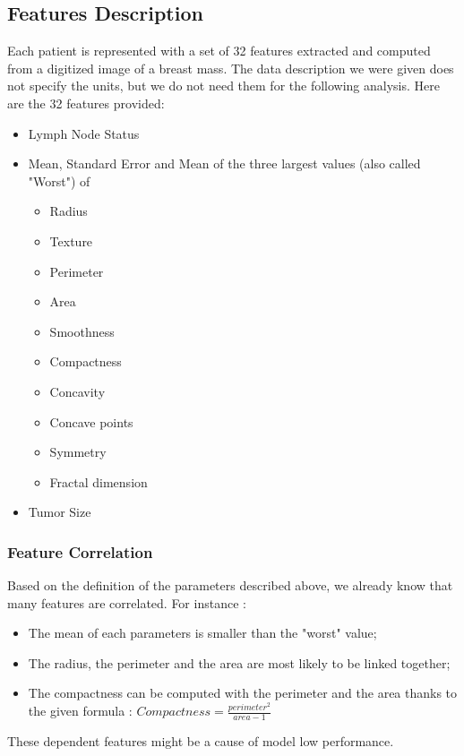 \documentclass[]{report}
\begin{document}
\subsection{Features Description}
Each patient is represented with a set of 32 features extracted and computed from a digitized image of a breast mass. The data description we were given does not specify the units, but we do not need them for the following analysis. Here are the 32 features provided:  
\begin{itemize}
	\item Lymph Node Status
	
	\item Mean, Standard Error and Mean of the three largest values (also called "Worst") of 
	\begin{itemize}
		\item Radius
		\item Texture
		\item Perimeter
		\item Area
		\item Smoothness
		\item Compactness
		\item Concavity
		\item Concave points
		\item Symmetry
		\item Fractal dimension
	\end{itemize}
	
	\item Tumor Size
\end{itemize}

\subsubsection{Feature Correlation}
Based on the definition of the parameters described above, we already know that many features are correlated. For instance : 
\begin{itemize}
	\item The mean of each parameters is smaller than the "worst" value;
	\item The radius, the perimeter and the area are most likely to be linked together;
	\item The compactness can be computed with the perimeter and the area thanks to the given formula : $Compactness = \frac{perimeter^2}{area - 1}$
\end{itemize}

These dependent features might be a cause of model low performance.
\end{document}
